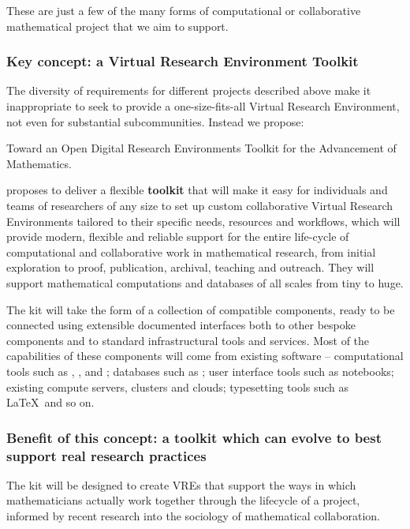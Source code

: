 These are just a few of the many forms of computational or
collaborative mathematical project that we aim to support.

\subsubsection{Key concept: a Virtual Research Environment Toolkit}

The diversity of requirements for different projects described above
make it inappropriate to seek to provide  a one-size-fits-all Virtual Research
Environment, not even for substantial subcommunities. Instead we propose:

\begin{framed}
  Toward an Open Digital Research Environments Toolkit for the
  Advancement of Mathematics.

  \TheProject proposes to deliver a flexible \textbf{toolkit} that
  will make it easy for individuals and teams of researchers of any
  size to set up custom collaborative Virtual Research Environments
  tailored to their specific needs, resources and workflows, which
  will provide modern, flexible and reliable support for the entire
  life-cycle of computational and collaborative work in mathematical
  research, from initial exploration to proof, publication, archival,
  teaching and outreach. They will support mathematical computations
  and databases of all scales from tiny to huge.
\end{framed}

The kit will take the form of a collection of compatible components,
ready to be connected using extensible documented interfaces both to
other bespoke components and to standard infrastructural tools and
services. Most of the capabilities of these components will come from
existing software -- computational tools such as \Sage, \GAP,
\Singular and \Pari; databases such as \LMFDB; user interface tools
such as \Jupyter notebooks; existing compute servers, clusters and
clouds; typesetting tools such as \LaTeX\ and so on.

\subsubsection{Benefit of this concept: a toolkit which can evolve to best support
  real research practices}

The kit will be designed to create VREs that support the ways in which
mathematicians actually work together through the lifecycle of a
project, informed by recent research into the sociology of
mathematical collaboration.

